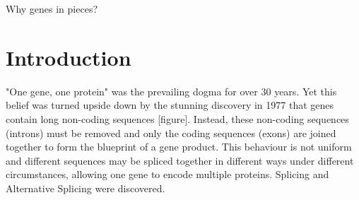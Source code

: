 \begin{savequote}[8cm]
Why genes in pieces?
\end{savequote}

\chapter{\label{ch:1-intro}Introduction} 
"One gene, one protein" was the prevailing dogma for over 30 years. Yet this belief was turned upside down by the stunning discovery in 1977 that genes contain long non-coding sequences \cite{discoveryofsplicing} [figure]. Instead, these non-coding sequences (introns) must be removed and only the coding sequences (exons) are joined together to form the blueprint of a gene product. This behaviour is not uniform and different sequences may be spliced together in different ways under different circumstances, allowing one gene to encode multiple proteins. Splicing and Alternative Splicing were discovered. 

%

